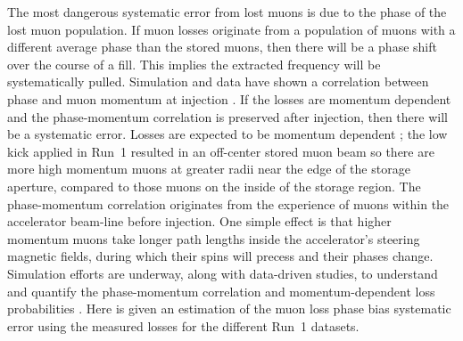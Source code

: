The most dangerous systematic error from lost muons is due to the \gmtwo phase of the lost muon population. If muon losses originate from a population of muons with a different average phase than the stored muons, then there will be a phase shift over the course of a fill. This implies the extracted \wa frequency will be systematically pulled. Simulation and data have shown a correlation between \gmtwo phase and muon momentum at injection \cite{HannahLossStudy,SudeshnaElbaTalk}. If the losses are momentum dependent and the phase-momentum correlation is preserved after injection, then there will be a systematic error. Losses are expected to be momentum dependent \cite{MikeLosses}; the low kick applied in Run~1 resulted in an off-center stored muon beam so there are more high momentum muons at greater radii near the edge of the storage aperture, compared to those muons on the inside of the storage region. The phase-momentum correlation originates from the experience of muons within the accelerator beam-line before injection. One simple effect is that higher momentum muons take longer path lengths inside the accelerator's steering magnetic fields, during which their spins will precess and their \gmtwo phases change. Simulation efforts are underway, along with data-driven studies, to understand and quantify the phase-momentum correlation and momentum-dependent loss probabilities \cite{MikeLosses,HannahLossStudy2}. Here is given an estimation of the muon loss phase bias systematic error using the measured losses for the different Run~1 datasets.




